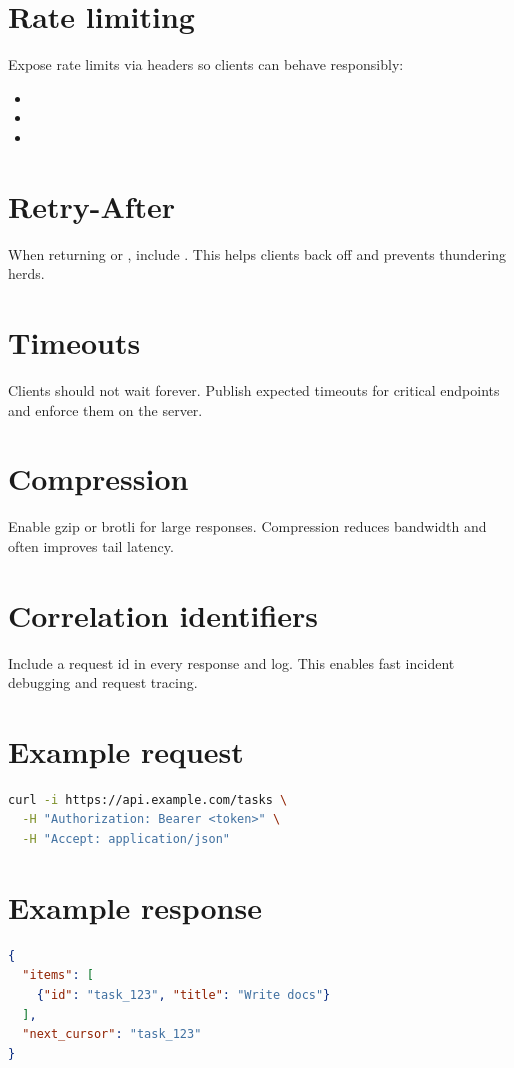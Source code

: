 \section{Rate limiting}
Expose rate limits via headers so clients can behave responsibly:
\begin{itemize}[nosep]
  \item {}
  \item {}
  \item {}
\end{itemize}

\section{Retry-After}
When returning  or , include .
This helps clients back off and prevents thundering herds.

\section{Timeouts}
Clients should not wait forever.
Publish expected timeouts for critical endpoints and enforce them on the server.

\section{Compression}
Enable gzip or brotli for large responses.
Compression reduces bandwidth and often improves tail latency.

\section{Correlation identifiers}
Include a request id in every response and log.
This enables fast incident debugging and request tracing.

\section{Example request}
\begin{lstlisting}[language=Bash]
curl -i https://api.example.com/tasks \
  -H "Authorization: Bearer <token>" \
  -H "Accept: application/json"
\end{lstlisting}

\section{Example response}
\begin{lstlisting}[language=JSON]
{
  "items": [
    {"id": "task_123", "title": "Write docs"}
  ],
  "next_cursor": "task_123"
}
\end{lstlisting}

